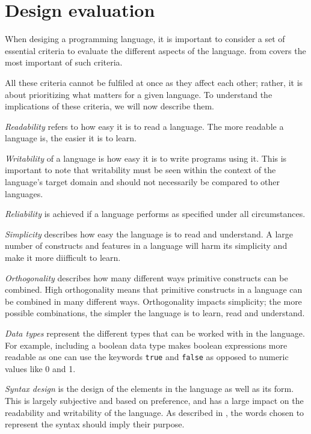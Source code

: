 \section{Design evaluation} \label{chap:design evaluation}
When desiging a programming language, it is important to consider a set of essential criteria to evaluate the different aspects of the language.
 from \cite{sebesta_concepts_2016} covers the most important of such criteria.


All these criteria cannot be fulfiled at once as they affect each other; rather, it is about prioritizing what matters for a given language. 
To understand the implications of these criteria, we will now describe them.


\textit{Readability} refers to how easy it is to read a language.
The more readable a language is, the easier it is to learn.

\textit{Writability} of a language is how easy it is to write programs using it.
This is important to note that writability must be seen within the context of the language's target domain and should not necessarily be compared to other languages.

\textit{Reliability} is achieved if a language performs as specified under all circumstances.

\textit{Simplicity} describes how easy the language is to read and understand. 
A large number of constructs and features in a language will harm its simplicity and make it more diifficult to learn.

\textit{Orthogonality} describes how many different ways primitive constructs can be combined. 
High orthogonality means that primitive constructs in a language can be combined in many different ways. 
Orthogonality impacts simplicity; the more possible combinations, the simpler the language is to learn, read and understand.

\textit{Data types} represent the different types that can be worked with in the language. 
For example, including a boolean data type makes boolean expressions more readable as one can use the keywords \texttt{true} and \texttt{false} as opposed to numeric values like 0 and 1. 

\textit{Syntax design} is the design of the elements in the language as well as its form. 
This is largely subjective and based on preference, and has a large impact on the readability and writability of the language. 
As described in , the words chosen to represent the syntax should imply their purpose.

